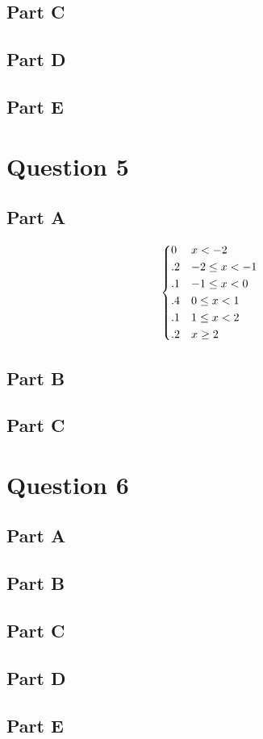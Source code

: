 \documentclass[letterpaper]{article}
\begin{document}
\subsection*{Part C}

\subsection*{Part D}

\subsection*{Part E}

\newpage

\section*{Question 5}

\subsection*{Part A}

\[ \begin{dcases}

0 & x < -2 \\
.2 & -2 \leq x < -1 \\
.1 & -1 \leq x < 0 \\
.4 & 0 \leq x < 1 \\
.1 & 1 \leq x < 2 \\
.2 & x \geq 2

\end{dcases}
\]

\subsection*{Part B}

\subsection*{Part C}

\newpage

\section*{Question 6}

\subsection*{Part A}

\subsection*{Part B}

\subsection*{Part C}

\subsection*{Part D}

\subsection*{Part E}
\end{document}

